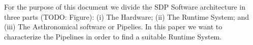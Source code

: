 For the purpose of this document we divide the SDP Software architecture in three parts (TODO: Figure): (i) The Hardware; (ii) The Runtime System;
and (iii) The Asthronomical software or Pipelies. In this paper we want to characterize the Pipelines in order to find a suitable Runtime System.







